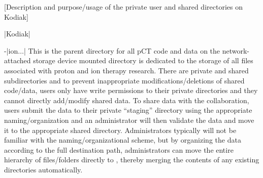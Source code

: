 [Description and purpose/usage of the private user and shared directories on Kodiak]
\begin{tcbenvironment}|Kodiak|
\begin{tcbparbox}-|\dirsep ion\dirsep$\dots$|%
This is the parent directory for all pCT code and data on the network-attached storage device mounted directory is dedicated to the storage of all files associated with proton and ion therapy research.  There are private and shared subdirectories and to prevent inappropriate modifications/deletions of shared code/data, users only have write permissions to their private directories and they cannot directly add/modify shared data.  To share data with the collaboration, users submit the data to their private ``staging'' directory using the appropriate naming/organization and an administrator will then validate the data and move it to the appropriate shared directory.  Administrators typically will not be familiar with the naming/organizational scheme, but by organizing the data according to the full destination path, administrators can move the entire hierarchy of files/folders directly to , thereby merging the contents of any existing directories automatically.\\[\tcbparskip]%


\end{tcbparbox}
\end{tcbenvironment}
